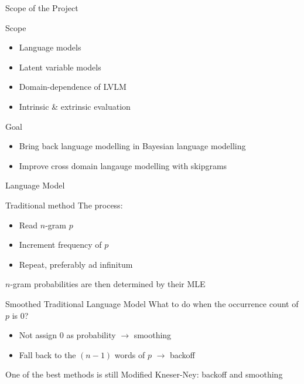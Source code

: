 \begin{frame}{Scope of the Project}
    \begin{block}{Scope}
        \begin{itemize}
            \item Language models
            \item Latent variable models
            \item Domain-dependence of LVLM
            \item Intrinsic \& extrinsic evaluation
        \end{itemize}
    \end{block}

    \begin{block}{Goal}
        \begin{itemize}
            \item Bring back language modelling in Bayesian language modelling
            \item Improve cross domain langauge modelling with skipgrams
        \end{itemize}
    \end{block}
\end{frame}
\note[itemize]{
}

\begin{frame}{Language Model}
    \begin{block}{Traditional method}
        The process:
        \begin{itemize}
            \item Read $n$-gram $p$
            \item Increment frequency of $p$
            \item Repeat, preferably ad infinitum
        \end{itemize}

        $n$-gram probabilities are then determined by their MLE
    \end{block}

    \begin{block}{Smoothed Traditional Language Model}
        What to do when the occurrence count of $p$ is 0?
        \begin{itemize}
            \item Not assign 0 as probability $\rightarrow$ smoothing
            \item Fall back to the $(n-1)$ words of $p$ $\rightarrow$ backoff
        \end{itemize}

        One of the best methods is still Modified Kneser-Ney: backoff and smoothing
    \end{block}
\end{frame}
\note[itemize]{
}

